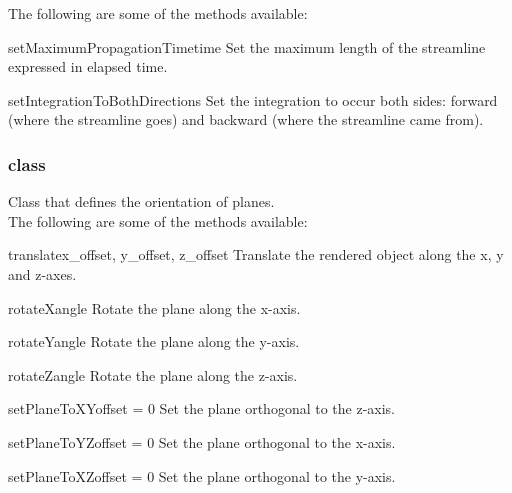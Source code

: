The following are some of the methods available:

\begin{methoddesc}[StreamLineModule]{setMaximumPropagationTime}{time}
Set the maximum length of the streamline expressed in elapsed time.
\end{methoddesc}

\begin{methoddesc}[StreamLineModule]{setIntegrationToBothDirections}{}
Set the integration to occur both sides: forward (where the streamline
goes) and backward (where the streamline came from).
\end{methoddesc}

\subsubsection{\Transform class}
Class that defines the orientation of planes. \\

The following are some of the methods available:

\begin{methoddesc}[Transform]{translate}{x_offset, y_offset, z_offset}
Translate the rendered object along the x, y and z-axes.
\end{methoddesc}

\begin{methoddesc}[Transform]{rotateX}{angle}
Rotate the plane along the x-axis.
\end{methoddesc}

\begin{methoddesc}[Transform]{rotateY}{angle}
Rotate the plane along the y-axis.
\end{methoddesc}

\begin{methoddesc}[Transform]{rotateZ}{angle}
Rotate the plane along the z-axis.
\end{methoddesc}

\begin{methoddesc}[Transform]{setPlaneToXY}{offset = 0}
Set the plane orthogonal to the z-axis.
\end{methoddesc}

\begin{methoddesc}[Transform]{setPlaneToYZ}{offset = 0}
Set the plane orthogonal to the x-axis.
\end{methoddesc}

\begin{methoddesc}[Transform]{setPlaneToXZ}{offset = 0}
Set the plane orthogonal to the y-axis.
\end{methoddesc}


